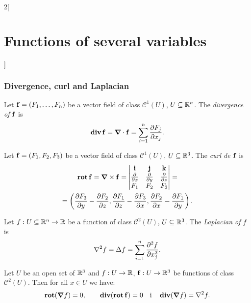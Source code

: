 \documentclass[../../../main.tex]{subfiles}
\begin{document}
\begin{multicols}{2}[\section{Functions of several variables}]
    \subsubsection*{Divergence, curl and Laplacian}
    \begin{definition}
        Let $\vb{f}=(F_1,\ldots, F_n)$ be a vector field of class $\mathcal{C}^1(U)$, $U\subseteq\mathbb{R}^n$. The \textit{divergence of $\vb{f}$} is $$\operatorname{\vb{div}}\vb{f}=\grad\cdot\vb{f}=\sum_{i=1}^n\frac{\partial F_j}{\partial x_j}.$$
    \end{definition}
    \begin{definition}
        Let $\vb{f}=(F_1,F_2,F_3)$ be a vector field of class $\mathcal{C}^1(U)$, $U\subseteq\mathbb{R}^3$. The \textit{curl de $\vb{f}$} is \begin{multline*}
            \operatorname{\vb{rot}}\vb{f}=\grad\times\vb{f}=\begin{vmatrix}
                \textbf{i}                  & \textbf{j}                  & \textbf{k}                  \\
                \frac{\partial}{\partial x} & \frac{\partial}{\partial y} & \frac{\partial}{\partial z} \\
                F_1                         & F_2                         & F_3                         \\
            \end{vmatrix}=\\=\left(\frac{\partial F_3}{\partial y}-\frac{\partial F_2}{\partial z},\frac{\partial F_1}{\partial z}-\frac{\partial F_3}{\partial x},\frac{\partial F_2}{\partial x}-\frac{\partial F_1}{\partial y}\right).
        \end{multline*}
    \end{definition}
    \begin{definition}
        Let $f:U\subseteq\mathbb{R}^n\rightarrow\mathbb{R} $ be a function of class $\mathcal{C}^2(U)$, $U\subseteq\mathbb{R}^3$. The \textit{Laplacian of $f$} is $$\nabla^2 f=\Delta f=\sum_{i=1}^n\frac{\partial^2 f}{\partial x_j^2}.$$
    \end{definition}
    \begin{prop}
        Let $U$ be an open set of $\mathbb{R}^3$ and $f:U\rightarrow\mathbb{R} $, $\vb{f}:U\rightarrow\mathbb{R}^3$ be functions of class $\mathcal{C}^2(U)$. Then for all $x\in U$ we have: $$\operatorname{\vb{rot}}(\grad f)=0,\qquad\operatorname{\vb{div}}(\operatorname{\vb{rot}}\vb{f})=0\quad\text{i}\quad\operatorname{\vb{div}}(\grad f)=\nabla^2 f.$$
    \end{prop}

\end{multicols}
\end{document}
